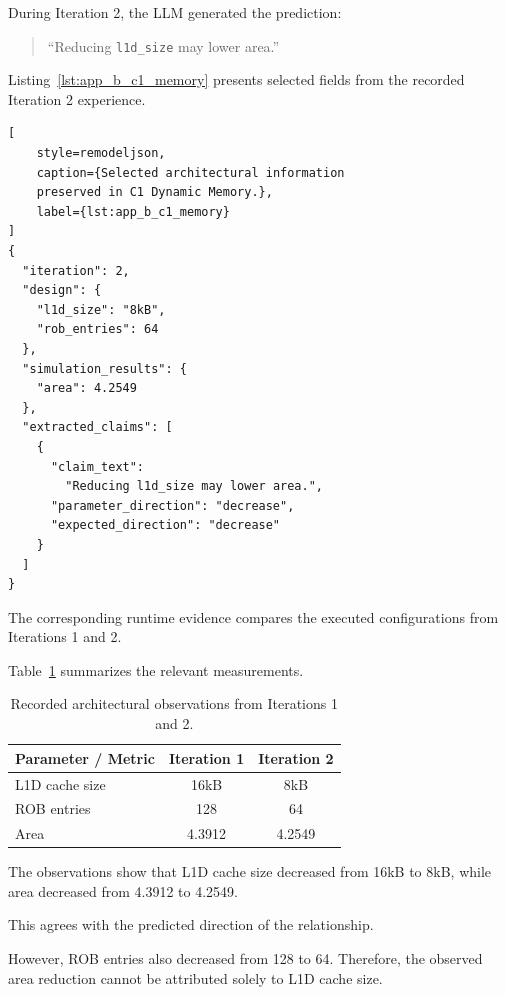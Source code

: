During Iteration 2, the LLM
generated the prediction:

\begin{quote}
``Reducing \texttt{l1d\_size}
may lower area.''
\end{quote}

Listing~\ref{lst:app_b_c1_memory}
presents selected fields from the
recorded Iteration 2 experience.

\begin{lstlisting}[
    style=remodeljson,
    caption={Selected architectural information
    preserved in C1 Dynamic Memory.},
    label={lst:app_b_c1_memory}
]
{
  "iteration": 2,
  "design": {
    "l1d_size": "8kB",
    "rob_entries": 64
  },
  "simulation_results": {
    "area": 4.2549
  },
  "extracted_claims": [
    {
      "claim_text":
        "Reducing l1d_size may lower area.",
      "parameter_direction": "decrease",
      "expected_direction": "decrease"
    }
  ]
}
\end{lstlisting}

The corresponding runtime evidence
compares the executed configurations
from Iterations 1 and 2.

Table~\ref{tab:app_b_c1_observation}
summarizes the relevant measurements.

\begin{table}[htbp]
\centering
\caption{Recorded architectural observations
from Iterations 1 and 2.}
\label{tab:app_b_c1_observation}

\renewcommand{\arraystretch}{1.2}
\small

\begin{tabular}{lcc}
\toprule
\textbf{Parameter / Metric} &
\textbf{Iteration 1} &
\textbf{Iteration 2} \\
\midrule

L1D cache size & 16kB & 8kB \\
ROB entries & 128 & 64 \\
Area & 4.3912 & 4.2549 \\

\bottomrule
\end{tabular}
\end{table}

The observations show that
L1D cache size decreased
from 16kB to 8kB, while
area decreased from 4.3912
to 4.2549.

This agrees with the predicted
direction of the relationship.

However, ROB entries also decreased
from 128 to 64. Therefore,
the observed area reduction
cannot be attributed solely
to L1D cache size.


